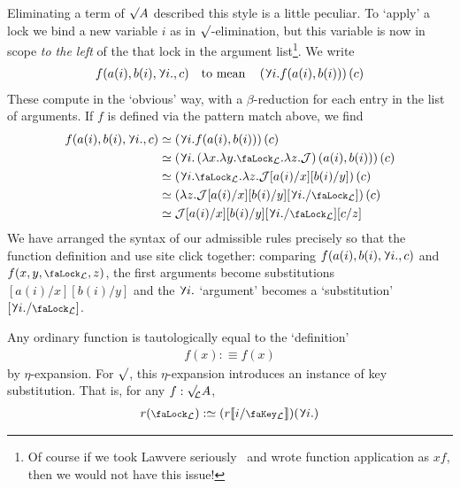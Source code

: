 \documentclass[10pt]{article}
\theoremstyle{definition}
\let\oldequiv\equiv%
\renewcommand{\equiv}{\simeq}
\newcommand{\defeq}{\oldequiv}
\newcommand{\judge}{\mathcal{J}}
\newcommand{\lock}{\mathchoice {\scalebox{0.8}{\text{\faLock}}}
  {\scalebox{0.8}{\text{\faLock}}} {\scalebox{0.5}{\text{\faLock}}}
  {\scalebox{0.4}{\text{\faLock}}} }
\newcommand{\key}{\mathchoice
  {\scalebox{0.8}{\text{\faKey}}} {\scalebox{0.8}{\text{\faKey}}}
  {\scalebox{0.5}{\text{\faKey}}} {\scalebox{0.4}{\text{\faKey}}} }
\newcommand{\rbindsym}{\raisebox{-0.5pt}{\scalerel*{\reflectbox{\rotatebox[origin=c]{185}{$\lambda$}}}{\lambda}}}
\newcommand{\rbind}[1]{\rbindsym{} #1.}
\newcommand{\lockn}[1]{\mathcal{#1}}
\newcommand{\ctxlocke}[1]{\lock_{#1}}
\newcommand{\ctxlock}[1]{\ctxlocke{\lockn{#1}}}
\newcommand{\stubra}[1]{\llbracket #1 \rrbracket}
\newcommand{\admbra}[1]{[ #1 ]}
\newcommand{\substucke}[2]{\stubra{#1/\key_{#2}}}
\newcommand{\substuck}[2]{\substucke{#1}{\lockn{#2}}}
\newcommand{\sublock}[2]{\admbra{\rbindsym{} #2. /\lock_{\lockn{#1}} }}
\newcommand{\rforme}[2]{\ThisStyle{\raisebox{0.07em}{$\SavedStyle \surd_{\hspace{-0.25em}#1}$}} #2}
\newcommand{\rform}[2]{\rforme{\lockn{#1}}{#2}}
\newcommand{\rformu}[1]{\ThisStyle{\raisebox{0.07em}{$\SavedStyle \surd$}} #1}
\newcommand{\rintroe}[2]{\lock_{#1}. #2}
\newcommand{\rintro}[2]{\rintroe{\lockn{#1}}{#2}}
\newcommand{\relim}[1]{\rbindsym #1}
\begin{document}
Eliminating a term of $\rformu{A}$ described this style is a little
peculiar.  To `apply' a lock we bind a new variable $i$ as in
$\surd$-elimination, but this variable is now in scope \emph{to the
  left} of the that lock in the argument list\footnote{Of course if we
  took Lawvere seriously~\cite{lawvere:adjointness-foundations} and
  wrote function application as $xf$, then we would not have this
  issue!}. We write
\begin{align*}
  f(a(i), b(i), \rbind{i}, c)
  \quad \text{to mean} \quad
  \left(\relim{i. f(a(i), b(i))}\right)(c)
\end{align*}
These compute in the `obvious' way, with a $\beta$-reduction for each
entry in the list of arguments. If $f$ is defined via the pattern
match above, we find
\begin{align*}
  f(a(i), b(i), \rbind{i}, c)
  &\defeq \left(\relim{i. f(a(i), b(i))}\right)(c) \\
  &\defeq \left(\relim{i. \left( \lambda x. \lambda y. \rintro{L}{\lambda z. \judge} \right)(a(i), b(i))}\right)(c) \\
  &\defeq \left(\relim{i. \rintro{L}{\lambda z. \judge}[a(i)/x][b(i)/y]}\right)(c) \\
  &\defeq \left(\lambda z. \judge[a(i)/x][b(i)/y]\sublock{L}{i}\right)(c) \\
  &\defeq \judge[a(i)/x][b(i)/y]\sublock{L}{i}[c/z]
\end{align*}
We have arranged the syntax of our admissible rules precisely so that
the function definition and use site click together: comparing
$f(a(i), b(i), \rbind{i}, c)$ and $f(x,y,\ctxlock{L},z)$, the first
arguments become substitutions $[a(i)/x][b(i)/y]$ and the $\rbind{i}$
`argument' becomes a `substitution' $\sublock{L}{i}$.


Any ordinary function is tautologically equal to the `definition'
\begin{align*}
  f(x) :\defeq f(x)
\end{align*}
by $\eta$-expansion. For $\surd$, this $\eta$-expansion introduces an
instance of key substitution. That is, for any $f : \rform{L}{A}$,
\begin{align*}
  r(\ctxlock{L}) :\defeq (r\substuck{i}{L})(\rbind{i})
\end{align*}
\end{document}
